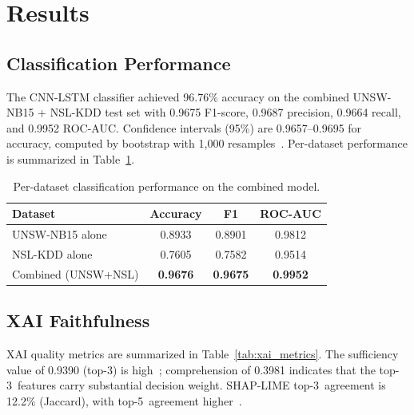 \documentclass[sensors,apajournal,article,submit,moreauthors]{Definitions/mdpi}
\begin{document}
\section{Results}

\subsection{Classification Performance}

The CNN-LSTM classifier achieved 96.76\% accuracy on the combined UNSW-NB15 + NSL-KDD test set with 0.9675 F1-score, 0.9687 precision, 0.9664 recall, and 0.9952 ROC-AUC. Confidence intervals (95\%) are 0.9657--0.9695 for accuracy, computed by bootstrap with 1{,}000 resamples~\citep{ferrag2020deep}. Per-dataset performance is summarized in Table~\ref{tab:perdataset}.

\begin{table}[H]
\caption{Per-dataset classification performance on the combined model.}
\label{tab:perdataset}
\begin{tabular}{lccc}
\toprule
\textbf{Dataset} & \textbf{Accuracy} & \textbf{F1} & \textbf{ROC-AUC}\\
\midrule
UNSW-NB15 alone & 0.8933 & 0.8901 & 0.9812\\
NSL-KDD alone & 0.7605 & 0.7582 & 0.9514\\
Combined (UNSW+NSL) & \textbf{0.9676} & \textbf{0.9675} & \textbf{0.9952}\\
\bottomrule
\end{tabular}
\end{table}

\subsection{XAI Faithfulness}

XAI quality metrics are summarized in Table~\ref{tab:xai_metrics}. The sufficiency value of 0.9390 (top-3) is high~\citep{lundberg2017unified}; comprehension of 0.3981 indicates that the \mbox{top-3 features} carry substantial decision weight. SHAP-LIME \mbox{top-3 agreement} is 12.2\% (Jaccard), with \mbox{top-5 agreement} higher~\citep{ribeiro2016why,doshi2017towards}.
\end{document}
